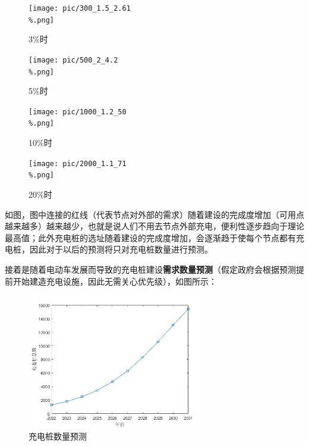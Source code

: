 \documentclass[12pt, a4paper, oneside]{ctexart}
\begin{document}
\begin{figure}[H]
  \centering
  \begin{minipage}[t]{0.5\textwidth}
    \texttt{[image: pic/300\_1.5\_2.61\\\%.png]}
    \caption{3\%时}
  \end{minipage}
  \begin{minipage}[t]{0.4\textwidth}
    \texttt{[image: pic/500\_2\_4.2\\\%.png]}
    \caption{5\%时}
  \end{minipage}
\end{figure}

\begin{figure}[H]
  \centering
  \begin{minipage}[t]{0.5\textwidth}
    \texttt{[image: pic/1000\_1.2\_50\\\%.png]}
    \caption{10\%时}
  \end{minipage}
  \begin{minipage}[t]{0.3\textwidth}
    \texttt{[image: pic/2000\_1.1\_71\\\%.png]}
    \caption{20\%时}
  \end{minipage}

\end{figure}

如图，图中连接的红线（代表节点对外部的需求）随着建设的完成度增加（可用点越来越多）越来越少，也就是说人们不用去节点外部充电，便利性逐步趋向于理论最高值；此外充电桩的选址随着建设的完成度增加，会逐渐趋于使每个节点都有充电桩，因此对于以后的预测将只对充电桩数量进行预测。

接着是随着电动车发展而导致的充电桩建设\textbf{需求数量预测}（假定政府会根据预测提前开始建造充电设施，因此无需关心优先级），如图所示：

\begin{figure}[H]
  \centering
  \includegraphics[width=0.7\textwidth]{pic/充电桩总数.jpg}
  \caption{充电桩数量预测}
  \label{fig:充电桩数量预测}
\end{figure}
\end{document}

